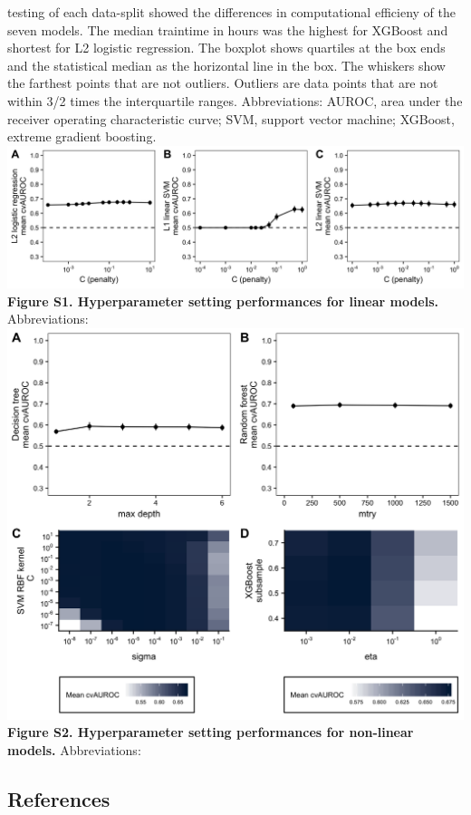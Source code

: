 \documentclass[11pt,]{article}
\begin{document}
testing of each data-split showed the differences in computational
efficieny of the seven models. The median traintime in hours was the
highest for XGBoost and shortest for L2 logistic regression. The boxplot
shows quartiles at the box ends and the statistical median as the
horizontal line in the box. The whiskers show the farthest points that
are not outliers. Outliers are data points that are not within 3/2 times
the interquartile ranges. Abbreviations: AUROC, area under the receiver
operating characteristic curve; SVM, support vector machine; XGBoost,
extreme gradient boosting.\\
\newpage
\includegraphics{Figure_S1.png} \textbf{Figure S1. Hyperparameter
setting performances for linear models.} Abbreviations: \newpage
\includegraphics{Figure_S2.png} \textbf{Figure S2. Hyperparameter
setting performances for non-linear models.} Abbreviations: \newpage

\subsection{References}\label{references}
\end{document}
